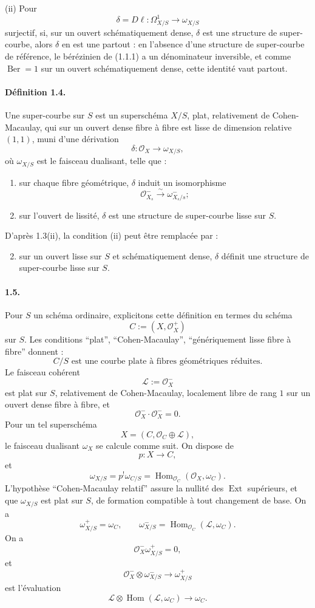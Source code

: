 \documentclass[11pt]{article}
\newcommand{\cO}{\mathcal O}
\newcommand{\cL}{\mathcal L}
\newcommand{\Ber}{\operatorname{Ber}}
\newcommand{\Hom}{\operatorname{Hom}}
\begin{document}
(ii) Pour
\[
  \delta=D\ell:\Omega^1_{X/S}\longrightarrow \omega_{X/S}
\]
surjectif, si, sur un ouvert schématiquement dense, $\delta$ est une structure de super-courbe, alors $\delta$ en est une partout : en l'absence d'une structure de super-courbe de référence, le bérézinien de (1.1.1) a un dénominateur inversible, et comme $\Ber=1$ sur un ouvert schématiquement dense, cette identité vaut partout.

\paragraph{Définition 1.4.}
Une super-courbe sur $S$ est un superschéma $X/S$, plat, relativement de Cohen-Macaulay, qui sur un ouvert dense fibre à fibre est lisse de dimension relative $(1,1)$, muni d'une dérivation
\[
  \delta:\cO_X\longrightarrow \omega_{X/S},
\]
où $\omega_{X/S}$ est le faisceau dualisant, telle que :
\begin{enumerate}[label=(\roman*)]
\item sur chaque fibre géométrique, $\delta$ induit un isomorphisme
\[
  \cO_{X_s}^- \xrightarrow{\sim} \omega_{X_s/s}^-;
\]
\item sur l'ouvert de lissité, $\delta$ est une structure de super-courbe lisse sur $S$.
\end{enumerate}
D'après 1.3(ii), la condition (ii) peut être remplacée par :
\begin{enumerate}[label=(\roman*${}'$)]
\setcounter{enumi}{1}
\item sur un ouvert lisse sur $S$ et schématiquement dense, $\delta$ définit une structure de super-courbe lisse sur $S$.
\end{enumerate}

\paragraph{1.5.}
Pour $S$ un schéma ordinaire, explicitons cette définition en termes du schéma
\[
  C:=(X,\cO_X^+)
\]
sur $S$. Les conditions ``plat'', ``Cohen-Macaulay'', ``génériquement lisse fibre à fibre'' donnent :
\begin{equation}\tag{1.5.1}
  C/S\text{ est une courbe plate à fibres géométriques réduites.}
\end{equation}
Le faisceau cohérent
\[
  \cL:=\cO_X^-
\]
est plat sur $S$, relativement de Cohen-Macaulay, localement libre de rang $1$ sur un ouvert dense fibre à fibre, et
\[
  \cO_X^-\cdot \cO_X^-=0.
\]
Pour un tel superschéma
\[
  X=(C,\cO_C\oplus \cL),
\]
le faisceau dualisant $\omega_X$ se calcule comme suit. On dispose de
\[
  p:X\longrightarrow C,
\]
et
\[
  \omega_{X/S}=p^!\omega_{C/S}=\Hom_{\cO_C}(\cO_X,\omega_C).
\]
L'hypothèse ``Cohen-Macaulay relatif'' assure la nullité des $\operatorname{Ext}$ supérieurs, et que $\omega_{X/S}$ est plat sur $S$, de formation compatible à tout changement de base. On a
\[
  \omega_{X/S}^+=\omega_C,
  \qquad
  \omega_{X/S}^-=\Hom_{\cO_C}(\cL,\omega_C).
\]
On a
\[
  \cO_X^-\omega_{X/S}^+=0,
\]
et
\[
  \cO_X^-\otimes\omega_{X/S}^-\to\omega_{X/S}^+
\]
est l'évaluation
\[
  \cL\otimes\Hom(\cL,\omega_C)\to\omega_C.
\]
\end{document}
